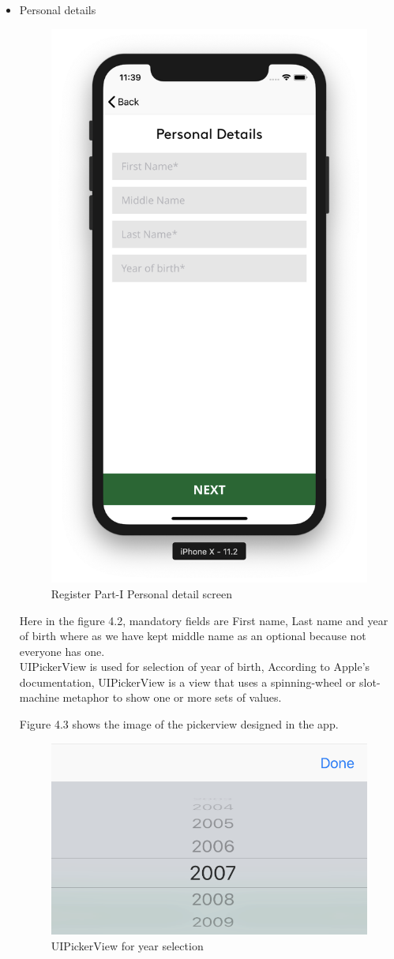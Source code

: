 \begin{itemize}

    \item Personal details
    
    \begin{figure}[H]
            \centering
            \includegraphics[width=0.4\linewidth]{figures/ch2/register_personal.png}
            \caption{\label{fig:wireframe_3} Register Part-I Personal detail screen}
    \end{figure}
    
    Here in the figure 4.2, mandatory fields are First name, Last name and year of birth where as we have kept middle name as an optional because not everyone has one. \\
    
    UIPickerView is used for selection of year of birth, According to Apple's documentation, UIPickerView is a view that uses a spinning-wheel or slot-machine metaphor to show one or more sets of values.
    
    Figure 4.3 shows the image of the pickerview designed in the app.
    
    \begin{figure}[H]
            \centering
            \includegraphics[width=0.4\linewidth]{figures/ch4/pickerview.png}
            \caption{\label{fig:wireframe_3} UIPickerView for year selection}
    \end{figure}
    

\end{itemize}
